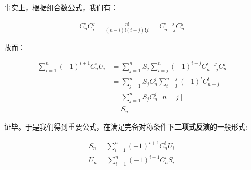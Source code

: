 \documentclass[UTF8]{book}
\begin{document}
事实上，根据组合数公式，我们有：
\begin{large}
    \begin{equation}
        \begin{aligned}
            C_n^iC_i^j=\frac{n!}{(n-i)!(i-j)!j!}=C_{n-j}^{i-j}C_n^j
            \nonumber
        \end{aligned}
    \end{equation}
\end{large}
故而：
\begin{large}
    \begin{equation}
        \begin{aligned}
            \sum_{i=1}^n(-1)^{i+1}C_n^iU_i &= \sum_{j=1}^nS_j\sum_{i=j}^n(-1)^{i+j}C_{n-j}^{i-j}C_n^j \\
            &= \sum_{j=1}^nS_jC_n^j\sum_{t=0}^{n-j}(-1)^tC_{n-j}^{t} \\
            &= \sum_{j=1}^nS_jC_n^j[n=j] \\
            &= S_n
            \nonumber
        \end{aligned}
    \end{equation}
\end{large}
证毕。于是我们得到重要公式，在满足完备对称条件下\textbf{二项式反演}的一般形式:
\begin{large}
    \begin{equation}
        \begin{aligned}
            S_n=\sum_{i=1}^n(-1)^{i+1}C_n^iU_i \\
            U_n=\sum_{i=1}^n(-1)^{i+1}C_n^iS_i
            \nonumber
        \end{aligned}
    \end{equation}
\end{large}
\end{document}
